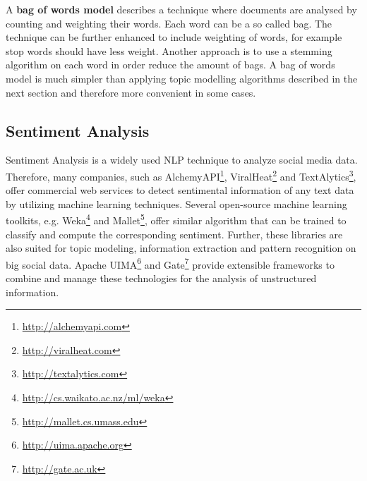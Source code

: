 A \textbf{bag of words model} describes a technique where documents are analysed by counting and weighting their words. Each word can be a so called bag. The technique can be further enhanced to include weighting of words, for example stop words should have less weight. Another approach is to use a stemming algorithm on each word in order reduce the amount of bags. A bag of words model is much simpler than applying topic modelling algorithms described in the next section and therefore more convenient in some cases. \cite[117]{manning2008introduction}


\subsection{Sentiment Analysis}
\label{subsec:sentiment-analysis}
Sentiment Analysis is a widely used NLP technique to analyze social media data. Therefore, many companies, such as AlchemyAPI\footnote{\url{http://alchemyapi.com} \accessednote}, ViralHeat\footnote{\url{http://viralheat.com} \accessednote} and TextAlytics\footnote{\url{http://textalytics.com} \accessednote}, offer commercial web services to detect sentimental information of any text data by utilizing machine learning techniques. Several open-source machine learning toolkits, e.g. Weka\footnote{\url{http://cs.waikato.ac.nz/ml/weka} \accessednote} and Mallet\footnote{\url{http://mallet.cs.umass.edu} \accessednote}, offer similar algorithm that can be trained to classify and compute the corresponding sentiment. Further, these libraries are also suited for topic modeling, information extraction and pattern recognition on big social data. Apache UIMA\footnote{\url{http://uima.apache.org} \accessednote} and Gate\footnote{\url{http://gate.ac.uk} \accessednote} provide extensible frameworks to combine and manage these technologies for the analysis of unstructured information.


